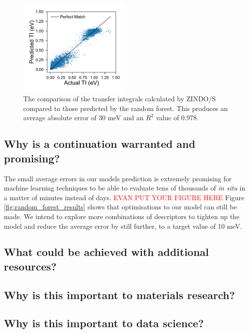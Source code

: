 \documentclass[12pt]{article}
\begin{document}
\begin{figure}\centering
	\includegraphics[width=0.5\textwidth]{Figures/comparison.pdf}
    \caption{
The comparison of the transfer integrals calculated by ZINDO/S compared to those predicted by the random forest.
This produces an average absolute error of 30 meV and an $R^2$ value of 0.978.
}
	\label{fig:fig2}
\end{figure}


\subsection{Why is a continuation warranted and promising?}

The small average errors in our models prediction is extremely promising for machine learning techniques to be able to evaluate tens of thousands of \textit{in situ} in a matter of minutes instead of days.
\textcolor{red}{EVAN PUT YOUR FIGURE HERE}
Figure \ref{fig:random_forest_results} shows that optimisations to our model can still be made.
We intend to explore more combinations of descriptors to tighten up the model and reduce the average error by still further, to a target value of 10 meV.


\subsection{What could be achieved with additional resources?}


\subsection{Why is this important to materials research?}

\subsection{Why is this important to data science?}
\end{document}
